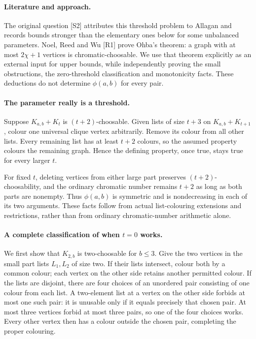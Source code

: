 \documentclass[11pt,a4paper]{article}
\begin{document}
\paragraph{Literature and approach.}
The original question [S2] attributes this threshold problem to Allagan
and records bounds stronger than the elementary ones below for some
unbalanced parameters. Noel, Reed and Wu [R1] prove Ohba's theorem:
a graph with at most $2\chi+1$ vertices is chromatic-choosable. We
use that theorem explicitly as an external input for upper bounds,
while independently proving the small obstructions, the zero-threshold
classification and monotonicity facts. These deductions do not determine
$\phi(a,b)$ for every pair.

\paragraph{The parameter really is a threshold.}
Suppose $K_{a,b}+K_t$ is $(t+2)$-choosable. Given lists of size
$t+3$ on $K_{a,b}+K_{t+1}$, colour one universal clique vertex
arbitrarily. Remove its colour from all other lists. Every remaining
list has at least $t+2$ colours, so the assumed property colours
the remaining graph. Hence the defining property, once true, stays
true for every larger $t$.

For fixed $t$, deleting vertices from either large part preserves
$(t+2)$-choosability, and the ordinary chromatic number remains $t+2$
as long as both parts are nonempty. Thus $\phi(a,b)$ is symmetric
and is nondecreasing in each of its two arguments. These facts follow
from actual list-colouring extensions and restrictions, rather than
from ordinary chromatic-number arithmetic alone.

\paragraph{A complete classification of when $t=0$ works.}
We first show that $K_{2,b}$ is two-choosable for $b\le3$. Give
the two vertices in the small part lists $L_1,L_2$ of size two.
If their lists intersect, colour both by a common colour; each vertex
on the other side retains another permitted colour. If the lists are
disjoint, there are four choices of an unordered pair consisting of
one colour from each list. A two-element list at a vertex on the
other side forbids at most one such pair: it is unusable only if
it equals precisely that chosen pair. At most three vertices forbid
at most three pairs, so one of the four choices works. Every other
vertex then has a colour outside the chosen pair, completing the
proper colouring.
\end{document}
